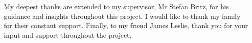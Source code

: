 \documentclass[
11pt,
oneside, 
english,
singlespacing,
headsepline, 
fleqn
]{MastersDoctoralThesis}
\begin{document}

\begin{acknowledgements}
\addchaptertocentry{\acknowledgementname} %
My deepest thanks are extended to my supervisor, Mr Stefan Britz, for his guidance and insights throughout this project. I would like to thank my family for their constant support. Finally, to my friend James Leslie, thank you for your input and support throughout the project.  
\end{acknowledgements}


\tableofcontents %

\listoffigures %

\listoftables %


\end{document}
